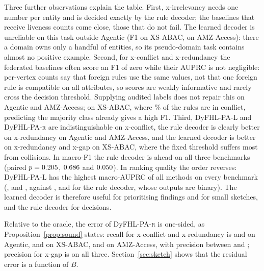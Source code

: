 \documentclass[preprint,12pt]{elsarticle}
\theoremstyle{definition}
\newcommand{\name}{DyFHL-PA\xspace}
\newcommand{\R}{\textsc{r}}
\begin{document}
Three further observations explain the table. First, x-irrelevancy needs one number per entity and is decided exactly by the rule decoder; the baselines that receive liveness counts come close, those that do not fail. The learned decoder is unreliable on this task outside Agentic (F1 \mainxustollerLirr{} on XS-ABAC, \mainamazonLirr{} on AMZ-Access): there a domain owns only a handful of entities, so its pseudo-domain task contains almost no positive example. Second, for x-conflict and x-redundancy the federated baselines often score an F1 of zero while their AUPRC is not negligible: per-vertex counts say that foreign rules use the same values, not that one foreign rule is compatible on all attributes, so scores are weakly informative and rarely cross the decision threshold. Supplying audited labels does not repair this on Agentic and AMZ-Access; on XS-ABAC, where \prevxustollercon\% of the rules are in conflict, predicting the majority class already gives a high F1. Third, \name-L and \name-\R{} are indistinguishable on x-conflict, the rule decoder is clearly better on x-redundancy on Agentic and AMZ-Access, and the learned decoder is better on x-redundancy and x-gap on XS-ABAC, where the fixed threshold suffers most from collisions. In macro-F1 the rule decoder is ahead on all three benchmarks (paired $p=0.205$, $0.686$ and $0.050$). In ranking quality the order reverses: \name-L has the highest macro-AUPRC of all methods on every benchmark (\mainagenticLap, \mainxustollerLap{} and \mainamazonLap, against \mainagenticRap, \mainxustollerRap{} and \mainamazonRap{} for the rule decoder, whose outputs are binary). The learned decoder is therefore useful for prioritising findings and for small sketches, and the rule decoder for decisions.

Relative to the oracle, the error of \name-\R{} is one-sided, as Proposition~\ref{prop:sound} states: recall for x-conflict and x-redundancy is \mainagenticRconrec{} and \mainagenticRredrec{} on Agentic, \mainxustollerRconrec{} and \mainxustollerRredrec{} on XS-ABAC, \mainamazonRconrec{} and \mainamazonRredrec{} on AMZ-Access, with precision between \mainxustollerRredprec{} and \mainamazonRconprec; precision for x-gap is \mainagenticRgapprec{} on all three. Section~\ref{sec:sketch} shows that the residual error is a function of $B$.

\begin{table}[t]
\caption{Cross-domain anomaly detection without pooling policies: F1 per task, macro-F1 and macro-AUPRC (mean $\pm$ std over seeds). Best mean per column and benchmark in bold. $^\dagger$Trained on 20\% of the oracle labels, tested on the remaining 80\%.}
\label{tab:main}
\centering\scriptsize
\setlength{\tabcolsep}{3pt}
\end{table}
\end{document}
